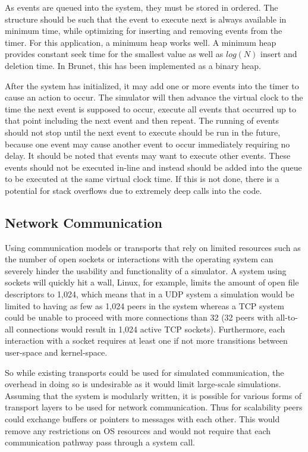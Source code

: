 As events are queued into the system, they must be stored in ordered.  The
structure should be such that the event to execute next is always available in
minimum time, while optimizing for inserting and removing events from the
timer.  For this application, a minimum heap works well.  A minimum heap
provides constant seek time for the smallest value as well as $log(N)$ insert
and deletion time.  In Brunet, this has been implemented as a binary heap.

After the system has initialized, it may add one or more events into the timer
to cause an action to occur.  The simulator will then advance the virtual clock
to the time the next event is supposed to occur, execute all events that
occurred up to that point including the next event and then repeat.  The
running of events should not stop until the next event to execute should be run
in the future, because one event may cause another event to occur immediately
requiring no delay.  It should be noted that events may want to execute other
events.  These events should not be executed in-line and instead should be
added into the queue to be executed at the same virtual clock time.  If this is
not done, there is a potential for stack overflows due to extremely deep calls
into the code.

\subsection{Network Communication}
\label{ap2p:nc}

Using communication models or transports that rely on limited resources such as
the number of open sockets or interactions with the operating system can
severely hinder the usability and functionality of a simulator.  A system using
sockets will quickly hit a wall, Linux, for example, limits the amount of open
file descriptors to 1,024, which means that in a UDP system a simulation would
be limited to having as few as 1,024 peers in the system whereas a TCP system
could be unable to proceed with more connections than 32 (32 peers with
all-to-all connections would result in 1,024 active TCP sockets).  Furthermore,
each interaction with a socket requires at least one if not more transitions
between user-space and kernel-space.

So while existing transports could be used for simulated communication, the
overhead in doing so is undesirable as it would limit large-scale simulations.
Assuming that the system is modularly written, it is possible for various forms
of transport layers to be used for network communication.  Thus for scalability
peers could exchange buffers or pointers to messages with each other.  This
would remove any restrictions on OS resources and would not require that each
communication pathway pass through a system call.

